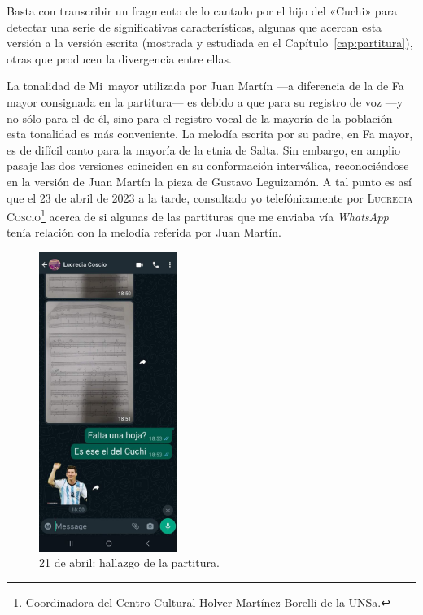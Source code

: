 Basta con transcribir un fragmento de lo cantado por el hijo del «Cuchi» para detectar una serie de significativas características, algunas que acercan esta versión a la versión escrita (mostrada y estudiada en el Capítulo~\ref{cap:partitura}), otras que producen la divergencia entre ellas.

La tonalidad de Mi\bemoltxt\ mayor utilizada por Juan Martín ---a diferencia de la de Fa mayor consignada en la partitura--- es debido a que para su registro de voz ---y no sólo para el de él, sino para el registro vocal de la mayoría de la población--- esta tonalidad es más conveniente. La melodía escrita por su padre, en Fa mayor, es de difícil canto para la mayoría de la etnia de Salta. Sin embargo, en amplio pasaje las dos versiones coinciden en su conformación interválica, reconociéndose en la versión de Juan Martín la pieza de Gustavo Leguizamón. A tal punto es así que el 23 de abril de 2023 a la tarde, consultado yo telefónicamente por \textsc{Lucrecia Coscio}\footnote{Coordinadora del Centro Cultural Holver Martínez Borelli de la UNSa.} acerca de si algunas de las partituras que me enviaba vía \emph{WhatsApp} tenía relación con la melodía referida por Juan Martín.

\begin{figure}[htb]
\centering
\includegraphics[width=0.4\textwidth]{img/lucrecia1}
\caption{21 de abril: hallazgo de la partitura.}
\label{fig:hallazgo-partitura}
\end{figure}


